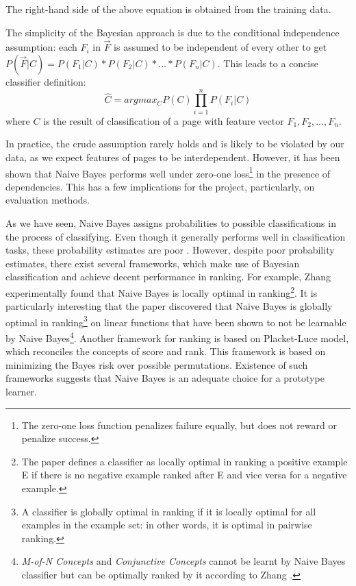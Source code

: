 \documentclass[12pt,notitlepage,twoside]{scrreprt}
\begin{document}
The right-hand side of the above equation is obtained from the training data.

The simplicity of the Bayesian approach is due to the conditional independence
assumption: each \(F_i\) in \(\vec{F}\) is assumed to be independent of every other
to get \(P(\vec{F}|C)=P(F_1|C)*P(F_2|C)*\dots*P(F_n|C)\). This leads to a concise classifier definition:
\begin{equation}
\hat{C}= argmax_C P(C)\prod_{i=1}^{n}P(F_i|C)
\end{equation}
where \(C\) is the result of classification of a page with feature vector
\(F_1,F_2,\dots,F_n\).

In practice, the crude assumption rarely  holds and is likely to be violated by our data,
as we expect features of pages to be interdependent.  However, it has been shown that
Naive Bayes performs well under zero-one loss\footnote{The zero-one loss function
	penalizes failure equally, but does not reward or penalize success.} in the
	presence of dependencies\cite{OPTIM}. This has a few implications for the project,
	particularly, on evaluation methods.

As we have seen, Naive Bayes assigns probabilities to possible classifications in the
process of classifying. Even though it generally performs well in classification tasks,
these probability estimates are poor \cite{domingos96}.  However, despite poor probability
estimates, there exist several frameworks, which make use of Bayesian classification and
achieve decent performance in ranking. For example, Zhang \cite{zhang04} experimentally
found that Naive Bayes is locally optimal in ranking\footnote{The paper defines a
	classifier as locally optimal in ranking a positive example E if there is no
negative example ranked after E and vice versa for a negative example.}.  It is
particularly interesting that the paper discovered that Naive Bayes is globally optimal in
ranking\footnote{A classifier is globally optimal in ranking if it is locally optimal for
all examples in the example set: in other words, it is optimal in pairwise ranking. } on
linear functions that have been shown to not be learnable by Naive
Bayes\footnote{\textit{M-of-N Concepts} and \textit{Conjunctive Concepts} cannot be learnt
by Naive Bayes classifier but can be optimally ranked by it according to Zhang
\cite{zhang04}.}.  Another framework for ranking \cite{bayesrank} is based on Placket-Luce
model, which reconciles the concepts of score and rank. This framework is based on
minimizing the Bayes risk over possible permutations.  Existence of such frameworks
suggests that Naive Bayes is an adequate choice for a prototype learner.
\end{document}
